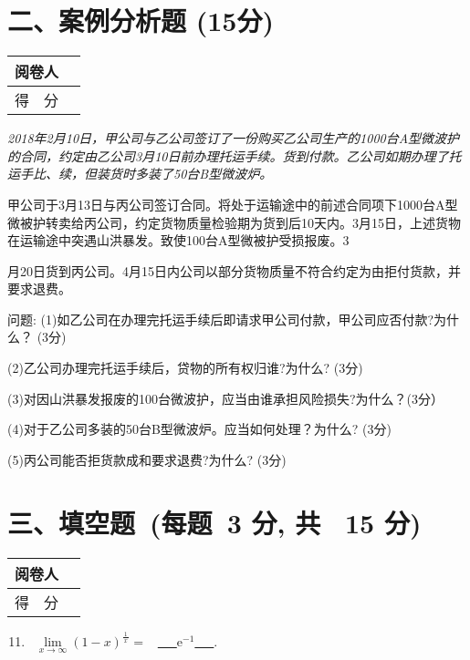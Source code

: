 \documentclass[twocolumn,landscape,UTF8]{ctexart}
\newcommand{\me}{\mathrm{e}}  %
\begin{document}
\begin{spacing}{1.3}
\begin{enumerate}
\end{enumerate}
\newpage
\section*{\hspace{4.5cm} 二、案例分析题 (15分)}
\vspace{-1cm}
\begin{tabular}{|p{}|p{}|}
\hline
\centering 阅卷人& \\
\hline
\centering 得~~分 &  \\
	\hline
\end{tabular}
\begin{enumerate}\setcounter{enumi}{5}
	\itshape 2018年2月10日，甲公司与乙公司签订了一份购买乙公司生产的1000台A型微波护的合同，约定由乙公司3月10日前办理托运手续。货到付款。乙公司如期办理了托运手比、续，但装货时多装了50台B型微波炉。

	甲公司于3月13日与丙公司签订合同。将处于运输途中的前述合同项下1000台A型微被护转卖给丙公司，约定货物质量检验期为货到后10天内。3月15日，上述货物在运输途中突遇山洪暴发。致使100台A型微被护受损报废。3
	
	月20日货到丙公司。4月15日内公司以部分货物质量不符合约定为由拒付货款，并要求退费。
	
	\normalfont
	问题:
	(1)如乙公司在办理完托运手续后即请求甲公司付款，甲公司应否付款?为什么？ (3分)

	(2)乙公司办理完托运手续后，贷物的所有权归谁?为什么? (3分)

	(3)对因山洪暴发报废的100台微波护，应当由谁承担风险损失?为什么？(3分）

	(4)对于乙公司多装的50台B型微波炉。应当如何处理？为什么? (3分)

	(5)丙公司能否拒货款成和要求退费?为什么? (3分)
\end{enumerate}

\vspace{2cm}
\section*{\hspace{5cm} 三、填空题~(每题~3 分, 共~ 15 分)}
\vspace{-1cm}

\begin{tabular}{|p{}|p{}|}
			\hline
			\centering 阅卷人& \\
			\hline
			\centering 得~~分 &  \\
			\hline
		\end{tabular}
		\begin{enumerate}\setcounter{enumi}{10}
			\item ~$\lim\limits_{x\rightarrow \infty}(1-x)^{\frac{\,1\,}{x}}=$ ~\underline{~~~$\me^{-1}$~~~}.
			

\end{enumerate}
\end{spacing}
\end{document}
